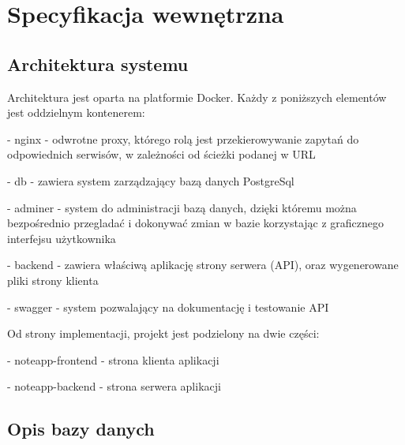 \documentclass[a4paper,twoside,12pt]{book}
\begin{document}
 



\chapter{Specyfikacja wewnętrzna}
\label{ch:05}

\section{Architektura systemu}

Architektura jest oparta na platformie Docker.
Każdy z poniższych elementów jest oddzielnym kontenerem:

- nginx - odwrotne proxy, którego rolą jest przekierowywanie zapytań do odpowiednich serwisów, w zależności od ścieżki podanej w URL

- db - zawiera system zarządzający bazą danych PostgreSql

- adminer - system do administracji bazą danych, dzięki któremu można bezpośrednio przegladać i dokonywać zmian w bazie korzystając z graficznego interfejsu użytkownika

- backend - zawiera właściwą aplikację strony serwera (API), oraz wygenerowane pliki strony klienta 

- swagger - system pozwalający na dokumentację i testowanie API

Od strony implementacji, projekt jest podzielony na dwie części:

- noteapp-frontend - strona klienta aplikacji

- noteapp-backend - strona serwera aplikacji


\section{Opis bazy danych}
\end{document}
